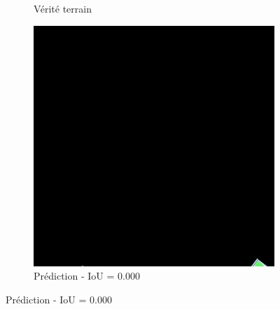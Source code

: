 \begin{figure}[H]
\begin{subfigure}{0.32\textwidth}
    \caption{Vérité terrain}
\end{subfigure}
\hfill
\begin{subfigure}{0.32\textwidth}
    \includegraphics[width=\textwidth]{02-main//figures/ch4/kfold_ensembles/linknet_timm-efficientnet-b5/worst_cases/worst_5_iou0.000_25051119_tile_18_9_ba3084_overlay_pred.png}
    \caption{Prédiction - IoU = 0.000}
\end{subfigure}

\vspace{0.35cm}


\end{figure}
